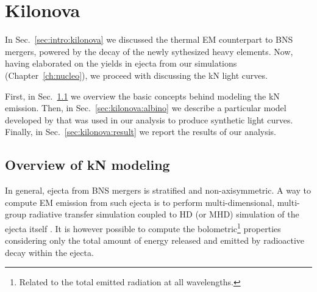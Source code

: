 
\chapter{Kilonova} \label{ch:kilonova} 

In Sec.~\ref{sec:intro:kilonova} we discussed the thermal \ac{EM} 
counterpart to \ac{BNS} mergers, powered by the decay of the newly 
sythesized heavy elements. Now, having elaborated on the 
\rproc{} yields in ejecta from our simulations (Chapter~\ref{ch:nucleo}), 
we proceed with discussing the \ac{kN} light curves. 

First, in Sec.~\ref{sec:kilonova:modeling} we overview the basic 
concepts behind modeling the \ac{kN} emission. 
%
Then, in Sec.~\ref{sec:kilonova:albino} we describe a particular model  
developed by \cite{Perego:2017wtu} that was used in our analysis 
to produce synthetic light curves. 
%
Finally, in Sec.~\ref{sec:kilonova:result} 
we report the results of our analysis.





\section{Overview of \ac{kN} modeling} \label{sec:kilonova:modeling}

In general, ejecta from \ac{BNS} mergers is stratified and non-axisymmetric. 
A way to compute \ac{EM} emission from such ejecta is to perform 
multi-dimensional, 
multi-group radiative transfer simulation coupled to \ac{HD} (or \ac{MHD}) 
simulation of the ejecta itself \citep[\eg][]{Bulla:2019muo}.
%
It is however possible to compute the bolometric\footnote{
    Related to the total emitted radiation at all wavelengths. 
} properties considering only the total amount 
of energy released and emitted by radioactive decay within the ejecta. 

